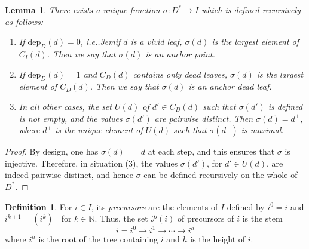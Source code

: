 \documentclass[12pt]{amsart}
\numberwithin{equation}{section}
\newtheorem{lem}[thm]{Lemma}
\theoremstyle{definition}
\newtheorem{defin}[thm]{Definition}
\def\ie{{i.e.}\kern.3em}
\def\dep{\mathrm{dep}} %
\begin{document}
\begin{lem}\label{lem-def-m} There exists a unique function $\sigma : D^* \to I$ which is defined recursively as follows: 
\begin{enumerate} 
\item If $\dep_D(d) = 0$, \ie if $d$ is a vivid leaf, $\sigma(d)$ is 
the largest element of $C_I(d)$. Then we say that $\sigma(d)$ is an \emph{anchor point}. 

\smallskip 
\item If $\dep_D(d) = 1$ and $C_D(d)$ contains only dead leaves, $\sigma(d)$ is the largest element of 
$C_D(d)$. Then we say that $\sigma(d)$ is an \emph{anchor dead leaf}. 

\smallskip 
\item In all other cases, the set $U(d)$ of $d' \in C_D(d)$ such that $\sigma(d')$ is  defined  is not empty, and the values 
$\sigma(d')$ are pairwise distinct. Then $\sigma(d) = d^+$, where $d^+$ is the unique element of $U(d)$ such that 
$\sigma(d^+)$ is maximal. 
\end{enumerate}
\end{lem}

\begin{proof} By design, one has $\sigma(d)^- = d$ at each step, and this ensures that $\sigma$ is injective. Therefore, 
in situation (3), the values $\sigma(d')$, for $d' \in U(d)$, are indeed pairwise distinct, and hence $\sigma$ can be defined 
recursively on the whole of $D^*$. 
\end{proof} 

\begin{defin} For $i\in I$, its \emph{precursors} are the elements of $I$ defined by $i^0 = i$ and 
$i^{k+1} = (i^k)^-$ for $k\in \mathbb{N}$. Thus, the set $\mathcal{P}(i)$ of precursors of $i$ is the stem 
$$
i = i^0 \to i^1 \to \cdots \to i^h
$$
where $i^h$ is the root of the tree containing $i$ and $h$ is the height of $i$. 
\end{defin} 
\end{document}
